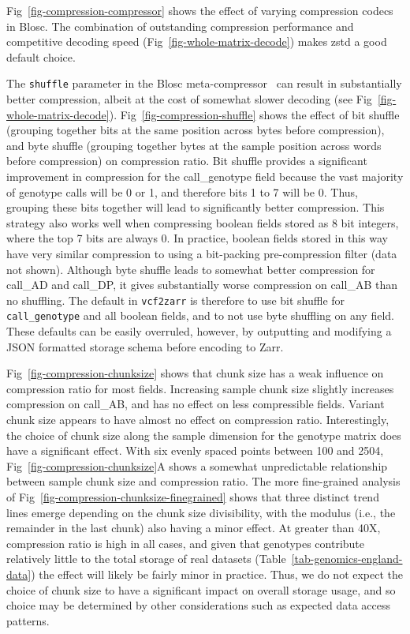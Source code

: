 \documentclass[a4paper,num-refs]{oup-contemporary}
\begin{document}
Fig~\ref{fig-compression-compressor} shows the effect of varying compression
codecs in Blosc. The combination of outstanding compression performance
and competitive decoding speed (Fig~\ref{fig-whole-matrix-decode}) 
makes zstd a good default choice.

The \texttt{shuffle} parameter in the Blosc meta-compressor~\cite{alted2010modern}
can result in substantially better compression, albeit at the 
cost of somewhat slower decoding (see Fig~\ref{fig-whole-matrix-decode}).
Fig~\ref{fig-compression-shuffle} shows the effect of 
bit shuffle (grouping together bits at the same position
across bytes before compression), and byte shuffle (grouping together 
bytes at the sample position across words before compression)
on compression ratio. Bit shuffle provides a significant
improvement in compression for the call\_genotype field  because 
the vast majority of genotype calls will be 0 or 1, and therefore 
bits 1 to 7 will be 0. Thus, grouping these bits together will 
lead to significantly better compression. This strategy also 
works well when compressing boolean fields stored as 
8 bit integers, where the top 7 bits are always 0. In practice,
boolean fields stored in this way have very similar compression
to using a bit-packing pre-compression filter (data not shown).
Although byte shuffle leads to somewhat better compression for call\_AD
and call\_DP, it gives substantially worse compression on call\_AB
than no shuffling. 
The default in \texttt{vcf2zarr}
is therefore to use bit shuffle for \texttt{call\_genotype}
and all boolean fields, and to not use 
byte shuffling on any field. These defaults can be easily
overruled, however, by outputting and modifying a JSON formatted 
storage schema before encoding to Zarr.



Fig~\ref{fig-compression-chunksize} shows that chunk size has a 
weak influence on compression ratio for most fields. 
Increasing sample chunk size slightly increases 
compression on call\_AB, and has no effect on less compressible
fields. Variant chunk size appears to have almost no effect 
on compression ratio. 
Interestingly, the choice of chunk size along the sample dimension for the
genotype matrix does have a significant effect. 
With six evenly spaced points between 100 and 2504,
Fig~\ref{fig-compression-chunksize}A shows a somewhat unpredictable 
relationship between sample chunk size and compression ratio.
The more fine-grained analysis of
Fig~\ref{fig-compression-chunksize-finegrained} shows that three
distinct trend lines emerge depending on the chunk size 
divisibility, with the modulus 
(i.e., the remainder in the last chunk) also having a minor effect. 
At greater than 40X,
compression ratio is 
high in all cases, and given that genotypes contribute relatively
little to the total storage of real datasets
(Table~\ref{tab-genomics-england-data}) the effect will
likely be fairly minor in practice.
Thus, we do not expect the choice of chunk size to have a significant
impact on overall storage usage, and so choice may be
determined by other considerations such as expected data
access patterns.
\end{document}
